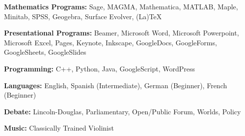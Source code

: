 \begin{enumSDot}[itemsep= 0.1cm]
\item {}

\item {} 
\end{enumSDot} \twomedskip





\begin{enumSDot}[itemsep=0.1cm]
\item {}
\item {}
\item {}
\item {}
\item {}
\item {} 
\end{enumSDot} \twomedskip










\begin{enumTriangle}
\item {\bfseries Mathematics Programs:} Sage, MAGMA, Mathematica, MATLAB, Maple, Minitab, SPSS, Geogebra, Surface Evolver, (La)TeX

\item {\bfseries Presentational Programs:} Beamer, Microsoft Word, Microsoft Powerpoint, Microsoft Excel, Pages, Keynote, Inkscape, GoogleDocs, GoogleForms, GoogleSheets, GoogleSlides

\item {\bfseries Programming:} C++, Python, Java, GoogleScript, WordPress

\item {\bfseries Languages:} English, Spanish (Intermediate), German (Beginner), French (Beginner)

\item {\bfseries Debate:} Lincoln-Douglas, Parliamentary, Open/Public Forum, Worlds, Policy 

\item {\bfseries Music:} Classically Trained Violinist
\end{enumTriangle} \twomedskip






